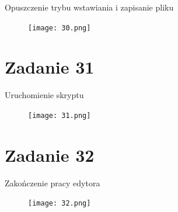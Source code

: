 \documentclass[fleqn,onecolumn,a4paper,12pt,titlepage]{article}
\begin{document}
Opuszczenie trybu wstawiania i zapisanie pliku
\begin{figure}[H]%
    \centering\texttt{[image: 30.png]}
\end{figure}

\section*{Zadanie 31}

Uruchomienie skryptu
\begin{figure}[H]%
    \centering\texttt{[image: 31.png]}
\end{figure}

\section*{Zadanie 32}

Zakończenie pracy edytora
\begin{figure}[H]%
    \centering\texttt{[image: 32.png]}
\end{figure}
\end{document}
